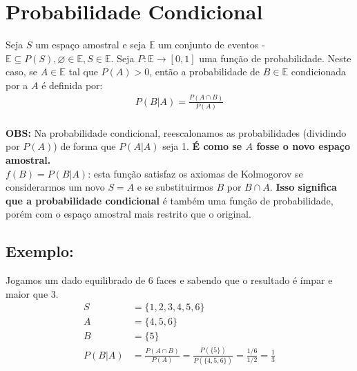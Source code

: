 \documentclass{article}
\renewcommand\bf[1]{\textbf{#1}}
\newcommand{\vn}{\varnothing}
\begin{document}
\setlength{\abovedisplayskip}{12pt}
\setlength{\belowdisplayskip}{12pt}
\setlength{\abovedisplayshortskip}{0pt}
\setlength{\belowdisplayshortskip}{0pt}
\setlength{\jot}{0pt}

\section{Probabilidade Condicional}
Seja $S$ um espaço amostral e seja $\mathbb{E}$ um conjunto de eventos - $\mathbb{E} \subseteq
P(S), \vn \in \mathbb{E}, S \in \mathbb{E}$. Seja $P:\mathbb{E} \rightarrow [0,1]$ uma função de
probabilidade. Neste caso, se $A \in \mathbb{E}$ tal que $P(A) > 0$, então a probabilidade de $B
\in \mathbb{E}$ condicionada por a $A$ é definida por:
\begin{align*}
    P(B|A) = \frac{P(A \cap B)}{P(A)}
\end{align*}
\\[0.5em]
\bf{OBS:} Na probabilidade condicional, reescalonamos as probabilidades (dividindo por $P(A)$) de
forma que $P(A|A)$ seja 1. \bf{É como se $A$ fosse o novo espaço amostral.}
\\
$f(B) = P(B|A)$: esta função satisfaz os axiomas de Kolmogorov se considerarmos um novo $S = A$ e
se substituirmos $B$ por $B \cap A$. \bf{Isso significa que a probabilidade condicional} é também
uma função de probabilidade, porém com o espaço amostral mais restrito que o original.

\subsection*{Exemplo:}
Jogamos um dado equilibrado de $6$ faces e sabendo que o resultado é ímpar e maior que 3.
\begin{align*}
    S &= \{1,2,3,4,5,6\} \\
    A &= \{4,5,6\} \\
    B &= \{5\} \\
    P(B|A) &= \frac{P(A \cap B)}{P(A)} = \frac{P(\{5\})}{P(\{4,5,6\})} = \frac{1/6}{1/2} =
    \frac{1}{3}
\end{align*}
\end{document}
